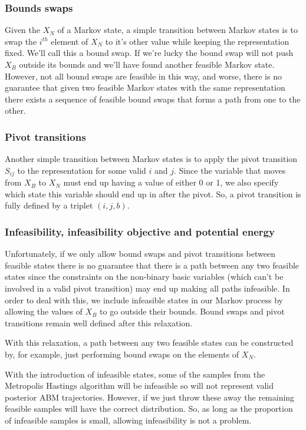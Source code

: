 \documentclass{article}
\begin{document}
\subsubsection{Bounds swaps}
Given the $X_N$ of a Markov state, a simple transition between Markov states is to swap the $i^{th}$ element of $X_N$ to it's other value while keeping the representation fixed. We'll call this a bound swap. If we're lucky the bound swap will not push $X_B$ outside its bounds and we'll have found another feasible Markov state. However, not all bound swaps are feasible in this way, and worse, there is no guarantee that given two feasible Markov states with the same representation there exists a sequence of feasible bound swaps that forms a path from one to the other.

\subsubsection{Pivot transitions}
Another simple transition between Markov states is to apply the pivot transition $S_{ij}$ to the representation for some valid $i$ and $j$. Since the variable that moves from $X_B$ to $X_N$ must end up having a value of either 0 or 1, we also specify which state this variable should end up in after the pivot. So, a pivot transition is fully defined by a triplet $(i,j,b)$.

\subsubsection{Infeasibility, infeasibility objective and potential energy}

Unfortunately, if we only allow bound swaps and pivot transitions between feasible states there is no guarantee that there is a path between any two feasible states since the constraints on the non-binary basic variables (which can't be involved in a valid pivot transition) may end up making all paths infeasible. In order to deal with this, we include infeasible states in our Markov process by allowing the values of $X_B$ to go outside their bounds. Bound swaps and pivot transitions remain well defined after this relaxation.

With this relaxation, a path between any two feasible states can be constructed by, for example, just performing bound swaps on the elements of $X_N$.

With the introduction of infeasible states, some of the samples from the Metropolis Hastings algorithm will be infeasible so will not represent valid posterior ABM trajectories. However, if we just throw these away the remaining feasible samples will have the correct distribution. So, as long as the proportion of infeasible samples is small, allowing infeasibility is not a problem.
\end{document}
